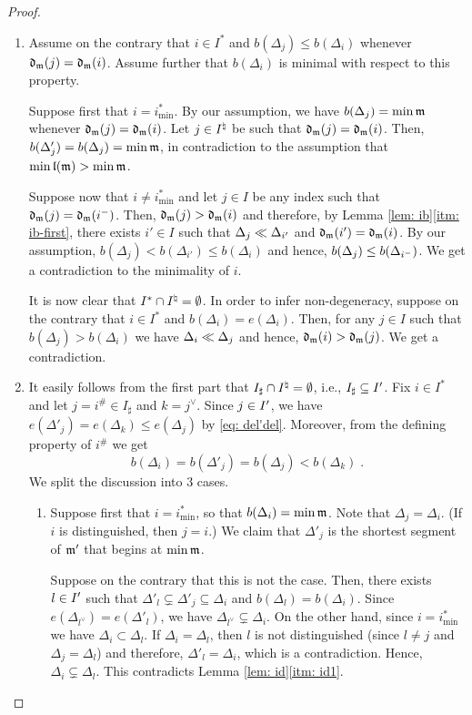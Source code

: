 \documentclass{ert-l} %
\begin{document}
\begin{proof}
\begin{enumerate}
\item
Assume on the contrary that $i\in I^*$ and $b(\Delta_j)\le b(\Delta_i)$ whenever $\mathfrak{d}_{\mathfrak{m}}(j)=\mathfrak{d}_{\mathfrak{m}}(i)$.
Assume further that $b(\Delta_i)$ is minimal with respect to this property.

Suppose first that $i=i^*_{\min}$.
By our assumption, we have $b(\Delta_j)=\min\mathfrak{m}$ whenever $\mathfrak{d}_{\mathfrak{m}}(j)=\mathfrak{d}_{\mathfrak{m}}(i)$.
Let $j\in I^{\natural}$ be such that $\mathfrak{d}_{\mathfrak{m}}(j)=\mathfrak{d}_{\mathfrak{m}}(i)$. Then, $b(\Delta'_j)=b(\Delta_j)=\min\mathfrak{m}$,
in contradiction to the assumption that $\min\mathfrak{l}(\mathfrak{m})>\min\mathfrak{m}$.

Suppose now that $i\ne i^*_{\min}$ and let $j\in I$ be any index such that $\mathfrak{d}_{\mathfrak{m}}(j)=\mathfrak{d}_{\mathfrak{m}}(i^-)$.
Then, $\mathfrak{d}_{\mathfrak{m}}(j)>\mathfrak{d}_{\mathfrak{m}}(i)$ and therefore, by Lemma \ref{lem: ib}\eqref{itm: ib-first},
there exists $i'\in I$ such that $\Delta_j\ll\Delta_{i'}$ and $\mathfrak{d}_{\mathfrak{m}}(i')=\mathfrak{d}_{\mathfrak{m}}(i)$.
By our assumption, $b(\Delta_j)<b(\Delta_{i'})\le b(\Delta_i)$
and hence, $b(\Delta_j)\le b(\Delta_{i^-})$.
We get a contradiction to the minimality of $i$.

It is now clear that $I^*\cap I^{\natural}=\emptyset$. In order to infer non-degeneracy, suppose on the contrary that $i\in I^*$ and $b(\Delta_i)=e(\Delta_i)$.
Then, for any $j\in I$ such that $b(\Delta_j)>b(\Delta_i)$ we have $\Delta_i\ll\Delta_j$ and hence, $\mathfrak{d}_{\mathfrak{m}}(i)>\mathfrak{d}_{\mathfrak{m}}(j)$.
We get a contradiction.

\item
It easily follows from the first part that $I_{\sharp}\cap I^{\natural}=\emptyset$, i.e., $I_{\sharp}\subseteq I'$.
Fix $i\in I^*$ and let $j=i^\#\in I_{\sharp}$ and $k=j^\vee$.
Since $j\in I'$, we have $e(\Delta'_j)=e(\Delta_k) \le e(\Delta_j)$ by \eqref{eq: del'del}.
Moreover, from the defining property of $i^\#$ we get
\begin{equation}\label{eq: dist}
b(\Delta_i)=b(\Delta'_j)=b(\Delta_j)< b(\Delta_k)\;.
\end{equation}
We split the discussion into 3 cases.

\begin{enumerate}
\item Suppose first that $i=i^*_{\min}$, so that $b(\Delta_i)=\min\mathfrak{m}$.
Note that $\Delta_j=\Delta_i$.
(If $i$ is distinguished, then $j=i$.)
We claim that $\Delta'_j$ is the shortest segment of $\mathfrak{m}'$ that begins at $\min\mathfrak{m}$.

Suppose on the contrary that this is not the case.
Then, there exists $l\in I'$ such that $\Delta'_l \subsetneq \Delta'_j \subseteq \Delta_i$ and $b(\Delta_l) = b(\Delta_i)$.
Since $e(\Delta_{l^\vee}) = e(\Delta'_l)$, we have $\Delta_{l^\vee}\subsetneq \Delta_i$.
On the other hand, since $i=i^*_{\min}$ we have $\Delta_i\subset \Delta_l$.
If $\Delta_i=\Delta_l$, then $l$ is not distinguished (since $l\ne j$ and $\Delta_j=\Delta_l$)
and therefore, $\Delta'_l=\Delta_i$, which is a contradiction.
Hence, $\Delta_i\subsetneq\Delta_l$.
This contradicts Lemma \ref{lem: id}\eqref{itm: id1}.


\end{enumerate}
\end{enumerate}
\end{proof}
\end{document}
